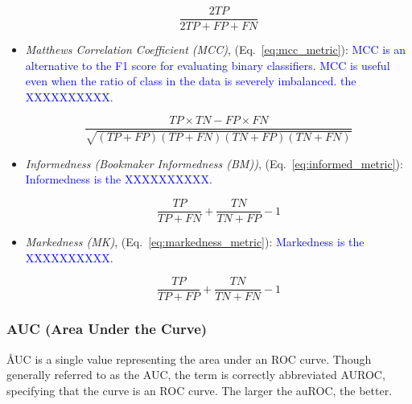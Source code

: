 \begin{itemize}
\begin{equation}
{\frac{2TP}{2TP+FP+FN}}
\label{eq:f1_metric}
\end{equation}

\item \textit{Matthews Correlation Coefficient (MCC)}, (Eq.~\ref{eq:mcc_metric}): \textcolor{blue}{MCC is  an alternative to the F1 score for evaluating binary classifiers. MCC is useful even when the ratio of class in the data is severely imbalanced. the XXXXXXXXXX}.

\begin{equation}
{\frac{TP \times TN - FP \times FN}{\sqrt{(TP + FP)(TP + FN)(TN + FP)(TN + FN)}}}
\label{eq:mcc_metric}
\end{equation}

\item \textit{Informedness (Bookmaker Informedness (BM))}, (Eq.~\ref{eq:informed_metric}): \textcolor{blue}{Informedness is the XXXXXXXXXX}.

\begin{equation}
{\frac{TP}{TP+FN}+\frac{TN}{TN+FP}-1}
\label{eq:informed_metric}
\end{equation}

\item \textit{Markedness (MK)}, (Eq.~\ref{eq:markedness_metric}): \textcolor{blue}{Markedness is the XXXXXXXXXX}.

\begin{equation}
{\frac{TP}{TP+FP}+\frac{TN}{TN+FN}-1}
\label{eq:markedness_metric}
\end{equation}


\end{itemize}

\subsubsection{AUC (Area Under the Curve)}


\r{AUC is a single value representing the area under an ROC curve. Though generally referred to as the AUC, the term is correctly abbreviated AUROC, specifying that the curve is an ROC curve. The larger the auROC, the better.}



